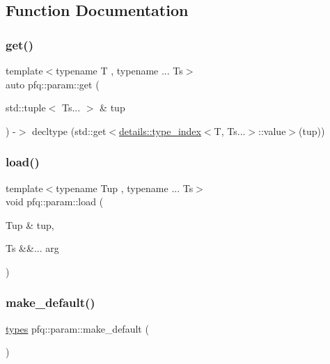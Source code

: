 \subsection{Function Documentation}
\mbox{\label{namespacepfq_1_1param_a26825d94a20bcf1cc8353307ea00f5b7}} 
\subsubsection{\texorpdfstring{get()}{get()}}
{\footnotesize\ttfamily template$<$typename T , typename ... Ts$>$ \\
auto pfq\+::param\+::get (\begin{DoxyParamCaption}\item[{std\+::tuple$<$ Ts... $>$ \&}]{tup }\end{DoxyParamCaption}) -\/$>$ decltype (std\+::get$<$\hyperlink{structpfq_1_1param_1_1details_1_1type__index}{details\+::type\+\_\+index}$<$T, Ts...$>$\+::value$>$(tup))
        }

\mbox{\label{namespacepfq_1_1param_a471f17aaae9cec51e821654d80d825cd}} 
\subsubsection{\texorpdfstring{load()}{load()}}
{\footnotesize\ttfamily template$<$typename Tup , typename ... Ts$>$ \\
void pfq\+::param\+::load (\begin{DoxyParamCaption}\item[{Tup \&}]{tup,  }\item[{Ts \&\&...}]{arg }\end{DoxyParamCaption})}

\mbox{\label{namespacepfq_1_1param_af1fd1aeb980688527db587b35f55abf2}} 
\subsubsection{\texorpdfstring{make\+\_\+default()}{make\_default()}}
{\footnotesize\ttfamily \hyperlink{namespacepfq_1_1param_adbf782e10a59b40189d34c425ff8218e}{types} pfq\+::param\+::make\+\_\+default (\begin{DoxyParamCaption}{ }\end{DoxyParamCaption})\hspace{0.3cm}{\ttfamily [inline]}}

